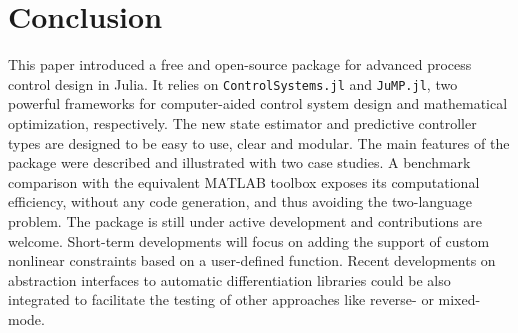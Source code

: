 \section{Conclusion}

This paper introduced a free and open-source package for advanced process control design in Julia. It relies on \texttt{ControlSystems.jl} and \texttt{JuMP.jl}, two powerful frameworks for computer-aided control system design and mathematical optimization, respectively. The new state estimator and predictive controller types are designed to be easy to use, clear and modular. The main features of the package were described and illustrated with two case studies. A benchmark comparison with the equivalent MATLAB toolbox exposes its computational efficiency, without any code generation, and thus avoiding the two-language problem. The package is still under active development and contributions are welcome. Short-term developments will focus on adding the support of custom nonlinear constraints based on a user-defined function. Recent developments on abstraction interfaces to automatic differentiation libraries could be also integrated to facilitate the testing of other approaches like reverse- or mixed-mode.